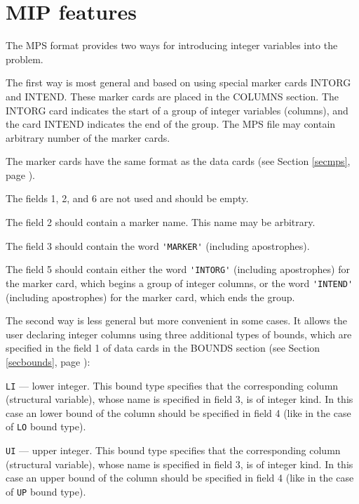 
\section{MIP features}


The MPS format provides two ways for introducing integer variables into
the problem.

The first way is most general and based on using special marker cards
INTORG and INTEND. These marker cards are placed in the COLUMNS section.
The INTORG card indicates the start of a group of integer variables
(columns), and the card INTEND indicates the end of the group. The MPS
file may contain arbitrary number of the marker cards.

The marker cards have the same format as the data cards (see Section
\ref{secmps}, page \pageref{secmps}).

The fields 1, 2, and 6 are not used and should be empty.

The field 2 should contain a marker name. This name may be arbitrary.

The field 3 should contain the word \verb|'MARKER'| (including
apostrophes).

The field 5 should contain either the word \verb|'INTORG'| (including
apostrophes) for the marker card, which begins a group of integer
columns, or the word \verb|'INTEND'| (including apostrophes) for the
marker card, which ends the group.

The second way is less general but more convenient in some cases. It
allows the user declaring integer columns using three additional types
of bounds, which are specified in the field 1 of data cards in the
BOUNDS section (see Section \ref{secbounds}, page \pageref{secbounds}):

\verb|LI| --- lower integer. This bound type specifies that the
corresponding column (structural variable), whose name is specified in
field 3, is of integer kind. In this case an lower bound of the
column should be specified in field 4 (like in the case of \verb|LO|
bound type).

\verb|UI| --- upper integer. This bound type specifies that the
corresponding column (structural variable), whose name is specified in
field 3, is of integer kind. In this case an upper bound of the
column should be specified in field 4 (like in the case of \verb|UP|
bound type).

